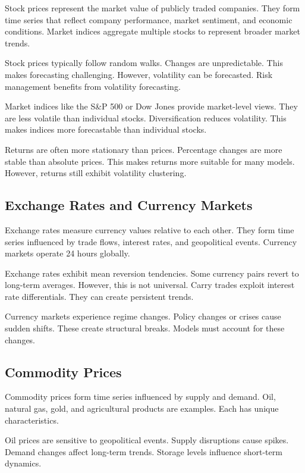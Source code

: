 Stock prices represent the market value of publicly traded companies. They form time series that reflect company performance, market sentiment, and economic conditions. Market indices aggregate multiple stocks to represent broader market trends.

Stock prices typically follow random walks. Changes are unpredictable. This makes forecasting challenging. However, volatility can be forecasted. Risk management benefits from volatility forecasting.

Market indices like the S\&P 500 or Dow Jones provide market-level views. They are less volatile than individual stocks. Diversification reduces volatility. This makes indices more forecastable than individual stocks.

Returns are often more stationary than prices. Percentage changes are more stable than absolute prices. This makes returns more suitable for many models. However, returns still exhibit volatility clustering.

\subsection{Exchange Rates and Currency Markets}

Exchange rates measure currency values relative to each other. They form time series influenced by trade flows, interest rates, and geopolitical events. Currency markets operate 24 hours globally.

Exchange rates exhibit mean reversion tendencies. Some currency pairs revert to long-term averages. However, this is not universal. Carry trades exploit interest rate differentials. They can create persistent trends.

Currency markets experience regime changes. Policy changes or crises cause sudden shifts. These create structural breaks. Models must account for these changes.

\subsection{Commodity Prices}

Commodity prices form time series influenced by supply and demand. Oil, natural gas, gold, and agricultural products are examples. Each has unique characteristics.

Oil prices are sensitive to geopolitical events. Supply disruptions cause spikes. Demand changes affect long-term trends. Storage levels influence short-term dynamics.

